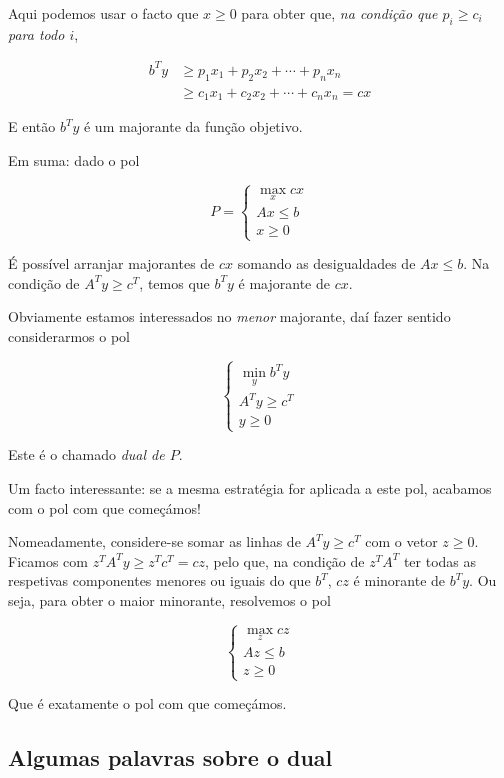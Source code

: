 \documentclass{article}
\theoremstyle{definition}
\begin{document}
	Aqui podemos usar o facto que $x \geq 0$ para obter que, \emph{na condição que $p_i \geq c_i$ para todo $i$},
	
	\begin{align*}
	b^T y &\geq p_1 x_1 + p_2 x_2 + \cdots + p_n x_n\\
	&\geq c_1 x_1 + c_2 x_2 + \cdots + c_n x_n = cx
	\end{align*}
	
	E então $b^T y$ é um majorante da função objetivo.
	
	Em suma: dado o pol
	
	\[
	P =
	\begin{cases}
	\max\limits_x cx\\
	Ax \leq b\\
	x \geq 0
	\end{cases}
	\]
	
	É possível arranjar majorantes de $cx$ somando as desigualdades de $Ax \leq b$. Na condição de $A^T y \geq c^T$, temos que $b^T y$ é majorante de $cx$.
	
	Obviamente estamos interessados no \emph{menor} majorante, daí fazer sentido considerarmos o pol
	
	\[
	\begin{cases}
	\min\limits_y b^T y\\
	A^T y \geq c^T\\
	y \geq 0
	\end{cases}
	\]
	
	Este é o chamado \emph{dual de $P$}.
	
	Um facto interessante: se a mesma estratégia for aplicada a este pol, acabamos com o pol com que começámos!
	
	Nomeadamente, considere-se somar as linhas de $A^T y \geq c^T$ com o vetor $z \geq 0$. Ficamos com $z^T A^T y \geq z^T c^T = cz$, pelo que, na condição de $z^T A^T$ ter todas as respetivas componentes menores ou iguais do que $b^T$, $cz$ é minorante de $b^T y$. Ou seja, para obter o maior minorante, resolvemos o pol
	
	\[
	\begin{cases}
	\max\limits_z cz\\
	Az \leq b\\
	z \geq 0
	\end{cases}
	\]
	
	Que é exatamente o pol com que começámos.
	
	\subsection{Algumas palavras sobre o dual}
	
\end{document}
